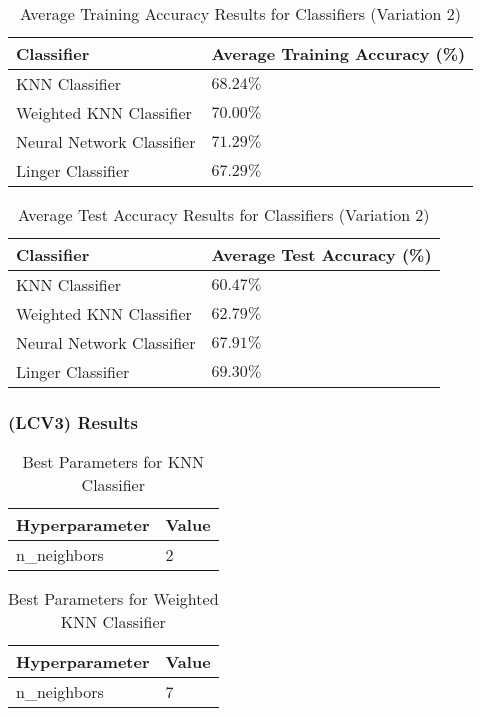\documentclass[a4paper, 12pt]{report}
\begin{document}
\begin{table}[H]
    \centering
    \caption{Average Training Accuracy Results for Classifiers (Variation 2)}
    \label{tab:average_results_train_LCV2_Glass}
    \begin{tabular}{|l|l|}
    \hline
    \textbf{Classifier} & \textbf{Average Training Accuracy (\%)} \\ \hline
    KNN Classifier & $68.24\%$ \\ \hline
    Weighted KNN Classifier & $70.00\%$ \\ \hline
    Neural Network Classifier & $71.29\%$ \\ \hline
    Linger Classifier & $67.29\%$ \\ \hline
    \end{tabular}
\end{table}

\begin{table}[H]
    \centering
    \caption{Average Test Accuracy Results for Classifiers (Variation 2)}
    \label{tab:average_results_test_LCV2_Glass}
    \begin{tabular}{|l|l|}
    \hline
    \textbf{Classifier} & \textbf{Average Test Accuracy (\%)} \\ \hline
    KNN Classifier & $60.47\%$ \\ \hline
    Weighted KNN Classifier & $62.79\%$ \\ \hline
    Neural Network Classifier & $67.91\%$ \\ \hline
    Linger Classifier & $69.30\%$ \\ \hline
    \end{tabular}
\end{table}

\subsubsection{(LCV3) Results}
\begin{table}[H]
    \centering
    \caption{Best Parameters for KNN Classifier}
    \label{tab:best_parameters_knn_LCV3_Glass}
    \begin{tabular}{|l|l|}
    \hline
    \textbf{Hyperparameter} & \textbf{Value} \\ \hline
    n\_neighbors & 2 \\ \hline
    \end{tabular}
\end{table}

\begin{table}[H]
    \centering
    \caption{Best Parameters for Weighted KNN Classifier}
    \label{tab:best_parameters_weighted_knn_LCV3_Glass}
    \begin{tabular}{|l|l|}
    \hline
    \textbf{Hyperparameter} & \textbf{Value} \\ \hline
    n\_neighbors & 7 \\ \hline
    \end{tabular}
\end{table}
\end{document}
